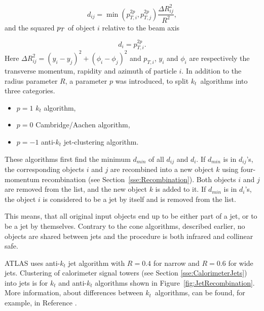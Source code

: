 \begin{equation}
	d_{ij} = \min{\left( p_{T,i}^{2p} , p_{T,j}^{2p} \right)} \frac{\Delta
    R_{ij}^2}{R^2},
\end{equation}
and the squared $p_{T}$ of object $i$ relative to the beam axis

\begin{equation}
	d_i = p_{T,i}^{2p}.
\end{equation}
Here $\Delta R_{ij}^2 = (y_i - y_j)^2 + (\phi_i - \phi_j)^2$ and $p_{T,i}$,
$y_i$ and $\phi_i$ are respectively the transverse momentum, rapidity and
azimuth of particle $i$. In addition to the radius parameter $R$, a 
parameter $p$ was introduced, to split $k_t$~algorithms into three categories.  
\begin{itemize}
	\item $p = 1$ $k_t$ algorithm,
	\item $p = 0$ Cambridge/Aachen algorithm,
	\item $p = -1$ anti-$k_t$ jet-clustering algorithm.
\end{itemize}

These algorithms first find the minimum $d_{min}$ of all $d_{ij}$ and $d_i$. If
$d_{min}$ is in $d_{ij}$'s, the corresponding objects $i$ and $j$ are recombined
into a new object $k$ using four-momentum recombination (see
Section~\ref{sse:Recombination}). Both objects $i$ and
$j$ are removed from the list, and the new object $k$ is added to it. If
$d_{min}$ is in $d_i$'s, the object $i$ is considered to be a jet by itself and
is removed from the list.

This means, that all original input objects end up to be either part of a jet, or
to be a jet by themselves. Contrary to the cone algorithms, described earlier, no
objects are shared between jets and the procedure is both infrared and collinear
safe.

ATLAS uses anti-$k_t$ jet algorithm with $R=0.4$ for narrow and $R=0.6$ for wide
jets.  Clustering of calorimeter signal towers (see Section
\ref{sse:CalorimeterJets}) into jets is for $k_t$ and anti-$k_t$ algorithms shown
in Figure~\ref{fig:JetRecombination}.  More information, about differences
between $k_t$~algorithms, can be found, for example, in Reference \cite{ANTIKT}.

